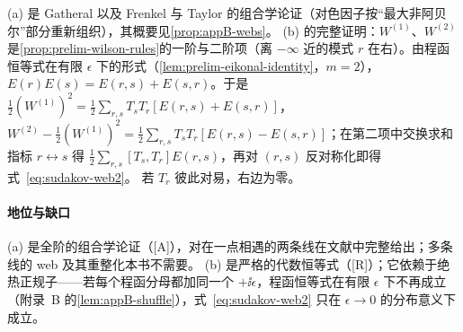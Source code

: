 \begin{proofsketch}
(a) 是 Gatheral 以及 Frenkel 与 Taylor 的组合学论证（对色因子按“最大非阿贝尔”部分重新组织），其概要见\cref{prop:appB-webs}。
(b) 的完整证明：$W^{(1)}$、$W^{(2)}$ 是\cref{prop:prelim-wilson-rules}的一阶与二阶项（离 $-\infty$ 近的模式 $r$ 在右）。由程函恒等式在有限 $\epsilon$ 下的形式（\cref{lem:prelim-eikonal-identity}，$m=2$），
$E(r)E(s)=E(r,s)+E(s,r)$。于是 $\frac12(W^{(1)})^2=\frac12\sum_{r,s}T_sT_r[E(r,s)+E(s,r)]$，
$W^{(2)}-\frac12(W^{(1)})^2=\frac12\sum_{r,s}T_sT_r[E(r,s)-E(s,r)]$；在第二项中交换求和指标 $r\leftrightarrow s$ 得 $\frac12\sum_{r,s}[T_s,T_r]E(r,s)$，再对 $(r,s)$ 反对称化即得式~\eqref{eq:sudakov-web2}。
若 $T_r$ 彼此对易，右边为零。
\end{proofsketch}

\paragraph{地位与缺口}(a) 是全阶的组合学论证（[A]），对在一点相遇的两条线在文献中完整给出\cite{Gatheral1983,FrenkelTaylor1984}；多条线的 web 及其重整化本书不需要。
(b) 是严格的代数恒等式（[R]）；它依赖于绝热正规子——若每个程函分母都加同一个 $+\ii\epsilon$，程函恒等式在有限 $\epsilon$ 下不再成立（附录~B 的\cref{lem:appB-shuffle}），式~\eqref{eq:sudakov-web2} 只在 $\epsilon\to0$ 的分布意义下成立。

